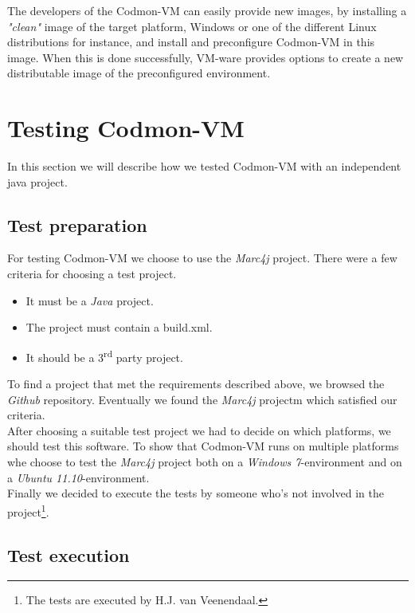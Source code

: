 \documentclass{article}
\newcommand{\project}{Codmon-VM}
\begin{document}
\noindent The developers of the \project{} can easily provide new images, by installing a \emph{"clean"} image of the target platform, Windows or one of the different Linux distributions for instance, and 
install and preconfigure \project{} in this image. When this is done successfully, VM-ware provides options to create a new distributable image of the preconfigured environment. 

\newpage
\section{Testing \project{}}
\label{test}
In this section we will describe how we tested \project{} with an independent java project.

\subsection{Test preparation}
\label{test:prep}
For testing \project{} we choose to use the \emph{Marc4j}\cite{marc4j} project. There were a few criteria for choosing a test project.

\begin{itemize}
\item It must be a \emph{Java} project.
\item The project must contain a build.xml.
\item It should be a 3\textsuperscript{rd} party project.
\end{itemize} 

\noindent To find a project that met the requirements described above, we browsed the \emph{Github}\cite{Github} repository. Eventually we found the \emph{Marc4j} projectm which satisfied our criteria.\\

\noindent After choosing a suitable test project we had to decide on which platforms, we should test this software. To show that \project{} runs on multiple platforms whe choose to test the \emph{Marc4j} 
project both on a \emph{Windows 7}-environment and on a \emph{Ubuntu 11.10}-environment.\\

\noindent Finally we decided to execute the tests by someone who's not involved in the project\footnote{The tests are executed by H.J. van Veenendaal.}.

\subsection{Test execution}
\label{test:exec}
\end{document}
